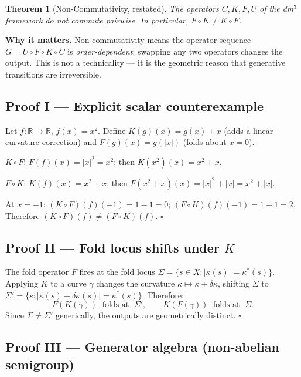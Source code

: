\documentclass[14pt,a4paper]{extarticle}
\newtheorem{theorem}{Theorem}[section]
\begin{document}
\begin{theorem}[Non-Commutativity, restated]
\label{thm:noncomm-full}
The operators $C, K, F, U$ of the dm$^3$ framework do not commute pairwise.
In particular, $F \circ K \ne K \circ F$.
\end{theorem}

\noindent\textbf{Why it matters.}
Non-commutativity means the operator sequence $G = U \circ F \circ K \circ C$
is \emph{order-dependent}: swapping any two operators changes the output.
This is not a technicality — it is the geometric reason that generative
transitions are irreversible.

\subsection*{Proof I\; — Explicit scalar counterexample}

Let $f: \mathbb{R} \to \mathbb{R}$, $f(x) = x^2$.
Define $K(g)(x) = g(x) + x$ (adds a linear curvature correction)
and $F(g)(x) = g(|x|)$ (folds about $x=0$).

\medskip\noindent
$K \circ F$: $F(f)(x) = |x|^2 = x^2$; then $K(x^2)(x) = x^2 + x$.

\noindent
$F \circ K$: $K(f)(x) = x^2 + x$; then $F(x^2+x)(x) = |x|^2 + |x| = x^2 + |x|$.

\medskip\noindent
At $x = -1$: $(K\circ F)(f)(-1) = 1 - 1 = 0$; $(F\circ K)(f)(-1) = 1 + 1 = 2$.
Therefore $(K\circ F)(f) \ne (F\circ K)(f)$.  \hfill $\square$

\subsection*{Proof II\; — Fold locus shifts under $K$}

The fold operator $F$ fires at the fold locus
$\Sigma = \{s \in X : |{\kappa(s)}| = \kappa^*(s)\}$.
Applying $K$ to a curve $\gamma$ changes the curvature
$\kappa \mapsto \kappa + \delta\kappa$, shifting $\Sigma$ to
$\Sigma' = \{s : |\kappa(s) + \delta\kappa(s)| = \kappa^*(s)\}$.
Therefore:
\[
  F(K(\gamma)) \;\text{ folds at }\; \Sigma',
  \qquad
  K(F(\gamma)) \;\text{ folds at }\; \Sigma.
\]
Since $\Sigma \ne \Sigma'$ generically, the outputs are geometrically distinct.  \hfill $\square$

\subsection*{Proof III\; — Generator algebra (non-abelian semigroup)}
\end{document}
